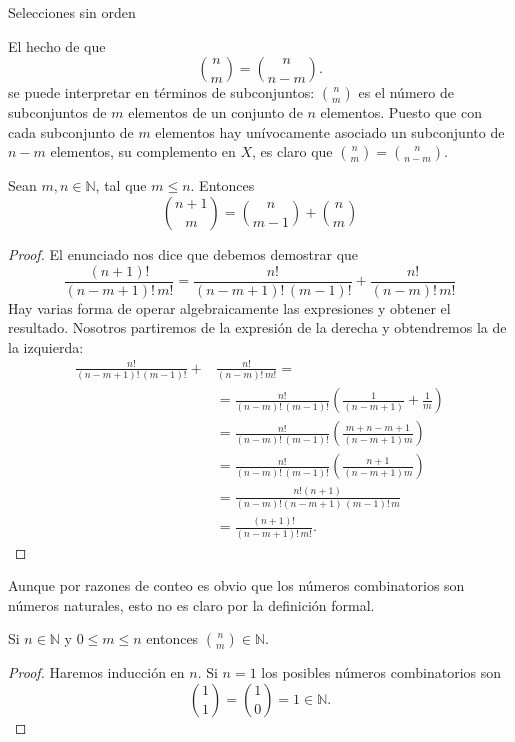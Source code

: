 \begin{section}{Selecciones sin orden}
\begin{observacion*}
El hecho  de que 
$$
\binom{n}{m} = \binom{n}{n-m}.
$$
se puede interpretar en términos de subconjuntos:  $\displaystyle\binom{n}{m}$ es el número de subconjuntos de $m$
ele\-men\-tos de un conjunto de $n$ elementos. Puesto que con cada subconjunto de $m$ ele\-men\-tos hay unívocamente asociado un subconjunto de $n - m$ elementos, su complemento en $X$, es claro que $\displaystyle\binom{n}{m} = \binom{n}{n-m}$.
\end{observacion*}

\begin{teorema} \label{teor-triangulo-de-pascal}
Sean $m,n \in \mathbb N$, tal que $m \le n$. Entonces
$$
\binom{n+1}{m} = \binom{n}{m-1} + \binom{n}{m}  
$$
\end{teorema}
\begin{proof}
El enunciado nos dice que debemos demostrar que 
\begin{equation*}
\frac{(n+1)!}{(n-m+1)!\,m!} = \frac{n!}{(n-m+1)!\,(m-1)!} +  \frac{n!}{(n-m)!\,m!}
\end{equation*}
Hay varias forma de operar algebraicamente las expresiones y obtener el resultado. Nosotros partiremos de la expresión de la derecha y obtendremos la de la izquierda:
\begin{align*}
\frac{n!}{(n-m+1)!\,(m-1)!} +  &\frac{n!}{(n-m)!\,m!}= \\&= \frac{n!}{(n-m)!\,(m-1)!}\left(\frac{1}{(n-m+1)} +  \frac{1}{m}\right)\\
&= \frac{n!}{(n-m)!\,(m-1)!}\left(\frac{m+n-m+1}{(n-m+1)m} \right) \\
& = \frac{n!}{(n-m)!\,(m-1)!}\left(\frac{n+1}{(n-m+1)m} \right) \\
& = \frac{n!(n+1)}{(n-m)!(n-m+1)\,(m-1)!\,m}\\
& = \frac{(n+1)!}{(n-m+1)!\,m!}.
\end{align*}

\end{proof}


Aunque por razones de conteo es obvio que los números combinatorios son números naturales, esto no es claro por la definición formal.  
\begin{corolario}
Si $n \in \mathbb N$ y $ 0\le m \le n$ entonces $\displaystyle\binom{n}{m} \in \mathbb N$.
\end{corolario}
\begin{proof}
Haremos inducción en $n$. Si $n = 1$ los posibles números
combinatorios son
$$
\binom{1}{1}  = \binom{1}{0}  = 1 \in \mathbb N.
$$


\end{proof}
\end{section}
